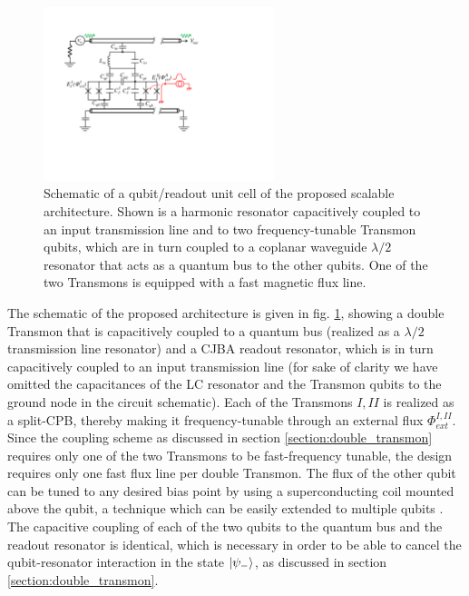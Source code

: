 \begin{figure}
	\centering
	\includegraphics[width=0.6\textwidth]{./material/figures/scalable-architecture/double_transmon_architecture_schematic}
	\caption[]{Schematic of a qubit/readout unit cell of the proposed scalable architecture. Shown is a harmonic resonator capacitively coupled to an input transmission line and to two frequency-tunable Transmon qubits, which are in turn coupled to a coplanar waveguide $\lambda/2$ resonator that acts as a quantum bus to the other qubits. One of the two Transmons is equipped with a fast magnetic flux line.}
	\label{fig:scalable_architecture_schematic}
\end{figure}

The schematic of the proposed architecture is given in fig. \ref{fig:scalable_architecture_schematic}, showing a double Transmon that is capacitively coupled to a quantum bus (realized as a $\lambda/2$ transmission line resonator) and a CJBA readout resonator, which is in turn capacitively coupled to an input transmission line (for sake of clarity we have omitted the capacitances of the LC resonator and the Transmon qubits to the ground node in the circuit schematic). Each of the Transmons $I,II$ is realized as a split-CPB, thereby making it frequency-tunable through an external flux $\Phi_{ext}^{I,II}$. Since the coupling scheme as discussed in section \ref{section:double_transmon} requires only one of the two Transmons to be fast-frequency tunable, the design requires only one fast flux line per double Transmon. The flux of the other qubit can be tuned to any desired bias point by using a superconducting coil mounted above the qubit, a technique which can be easily extended to multiple qubits \citep{baur_realizing_2012}. The capacitive coupling of each of the two qubits to the quantum bus and the readout resonator is identical, which is necessary in order to be able to cancel the qubit-resonator interaction in the state $\left| \psi_- \right>$, as discussed in section \ref{section:double_transmon}. 

